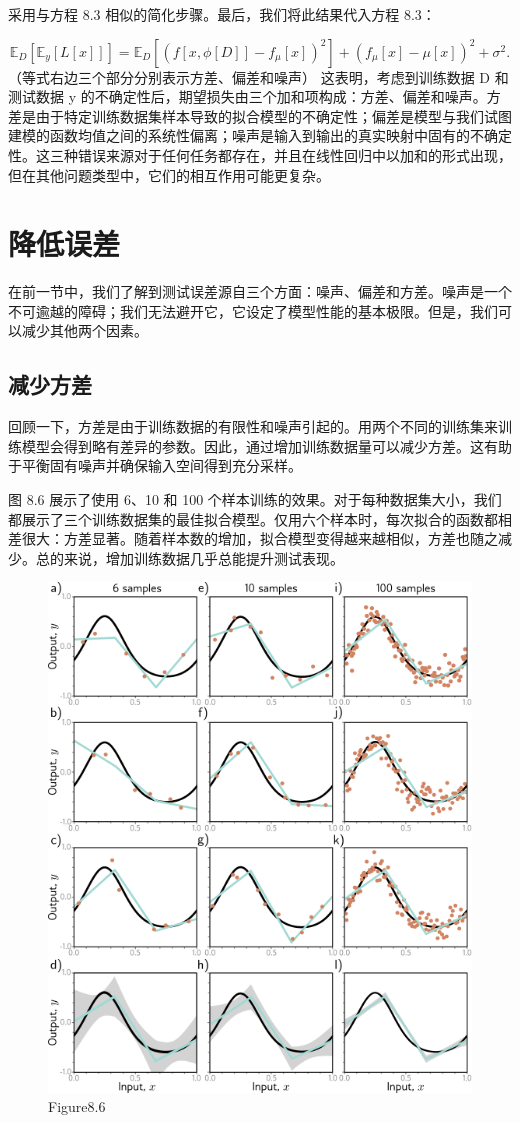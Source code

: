采用与方程 8.3 相似的简化步骤。最后，我们将此结果代入方程 8.3：

\[
\mathbb{E}_D[\mathbb{E}_y[L[x]]] = \mathbb{E}_D [(f[x, \phi[D]] - f_\mu[x])^2] + (f_\mu[x] - \mu[x])^2 + \sigma^2. \tag{8.7}
\]
（等式右边三个部分分别表示方差、偏差和噪声）
这表明，考虑到训练数据 D 和测试数据 y 的不确定性后，期望损失由三个加和项构成：方差、偏差和噪声。方差是由于特定训练数据集样本导致的拟合模型的不确定性；偏差是模型与我们试图建模的函数均值之间的系统性偏离；噪声是输入到输出的真实映射中固有的不确定性。这三种错误来源对于任何任务都存在，并且在线性回归中以加和的形式出现，但在其他问题类型中，它们的相互作用可能更复杂。
\section{降低误差}

在前一节中，我们了解到测试误差源自三个方面：噪声、偏差和方差。噪声是一个不可逾越的障碍；我们无法避开它，它设定了模型性能的基本极限。但是，我们可以减少其他两个因素。
\subsection{减少方差}
回顾一下，方差是由于训练数据的有限性和噪声引起的。用两个不同的训练集来训练模型会得到略有差异的参数。因此，通过增加训练数据量可以减少方差。这有助于平衡固有噪声并确保输入空间得到充分采样。

图 8.6 展示了使用 6、10 和 100 个样本训练的效果。对于每种数据集大小，我们都展示了三个训练数据集的最佳拟合模型。仅用六个样本时，每次拟合的函数都相差很大：方差显著。随着样本数的增加，拟合模型变得越来越相似，方差也随之减少。总的来说，增加训练数据几乎总能提升测试表现。

\begin{figure}[h!]
\centering
\includegraphics[width=0.7\linewidth]{png/chapter8/PerfVariance.png}
\caption{Figure8.6}
\end{figure}

